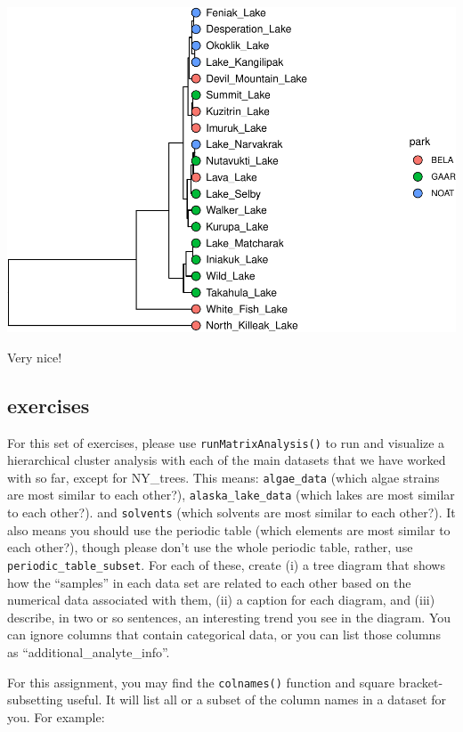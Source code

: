 \documentclass[
]{krantz}
\begin{document}
\begin{center}\includegraphics[width=1\linewidth]{index_files/figure-latex/unnamed-chunk-95-1} \end{center}

Very nice!

\hypertarget{exercises-3}{%
\subsection{exercises}\label{exercises-3}}

For this set of exercises, please use \texttt{runMatrixAnalysis()} to run and visualize a hierarchical cluster analysis with each of the main datasets that we have worked with so far, except for NY\_trees. This means: \texttt{algae\_data} (which algae strains are most similar to each other?), \texttt{alaska\_lake\_data} (which lakes are most similar to each other?). and \texttt{solvents} (which solvents are most similar to each other?). It also means you should use the periodic table (which elements are most similar to each other?), though please don't use the whole periodic table, rather, use \texttt{periodic\_table\_subset}. For each of these, create (i) a tree diagram that shows how the ``samples'' in each data set are related to each other based on the numerical data associated with them, (ii) a caption for each diagram, and (iii) describe, in two or so sentences, an interesting trend you see in the diagram. You can ignore columns that contain categorical data, or you can list those columns as ``additional\_analyte\_info''.

For this assignment, you may find the \texttt{colnames()} function and square bracket-subsetting useful. It will list all or a subset of the column names in a dataset for you. For example:
\end{document}
